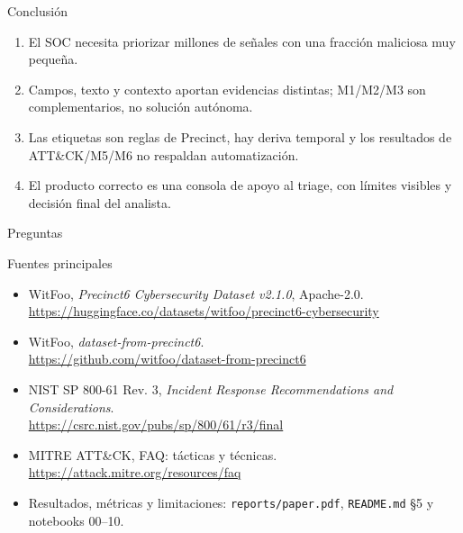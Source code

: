 \documentclass[aspectratio=169,10pt]{beamer}
\begin{document}
\begin{frame}{Conclusión}
\begin{enumerate}
  \item El SOC necesita priorizar millones de señales con una fracción maliciosa muy pequeña.
  \item Campos, texto y contexto aportan evidencias distintas; M1/M2/M3 son complementarios, no solución autónoma.
  \item Las etiquetas son reglas de Precinct, hay deriva temporal y los resultados de ATT\&CK/M5/M6 no respaldan automatización.
  \item El producto correcto es una consola de apoyo al triage, con límites visibles y decisión final del analista.
\end{enumerate}
\vfill
\centering
\Large Preguntas
\end{frame}

\begin{frame}{Fuentes principales}
\small
\begin{itemize}
  \item WitFoo, \emph{Precinct6 Cybersecurity Dataset v2.1.0}, Apache-2.0.\\
    \url{https://huggingface.co/datasets/witfoo/precinct6-cybersecurity}
  \item WitFoo, \emph{dataset-from-precinct6}.\\
    \url{https://github.com/witfoo/dataset-from-precinct6}
  \item NIST SP 800-61 Rev. 3, \emph{Incident Response Recommendations and Considerations}.\\
    \url{https://csrc.nist.gov/pubs/sp/800/61/r3/final}
  \item MITRE ATT\&CK, FAQ: tácticas y técnicas.\\
    \url{https://attack.mitre.org/resources/faq}
  \item Resultados, métricas y limitaciones: \texttt{reports/paper.pdf}, \texttt{README.md} §5 y notebooks 00--10.
\end{itemize}
\end{frame}
\end{document}
